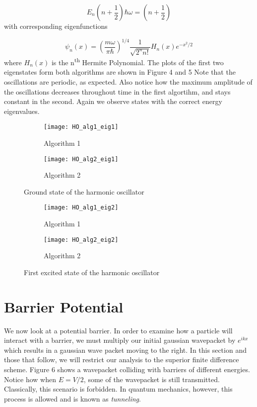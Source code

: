 \documentclass{article}
\begin{document}
\begin{equation}
E_n \left( n + \frac{1}{2} \right) \hbar \omega = \left( n + \frac{1}{2} \right)
\end{equation}
%
with corresponding eigenfunctions

\begin{equation}
\psi_n(x) = \left( \frac{m \omega}{\pi \hbar} \right)^{1/4} \frac{1}{\sqrt{2^n n!}} H_n(x)e^{-x^2/2}
\end{equation}
%
where $H_n(x)$ is the n\textsuperscript{th}  Hermite Polynomial. The plots of the first two eigenstates form both algorithms are shown in Figure 4 and 5
Note that the oscillations are periodic, as expected. Also notice how the maximum amplitude of the oscillations decreases throughout time in the first algortihm, and stays constant in the second. Again we observe states with the correct energy eigenvalues.

\begin{figure}
\centering
\begin{subfigure}[h!]{0.3\textwidth}
\centering
\texttt{[image: HO\_alg1\_eig1]}
\caption{Algorithm 1}
\end{subfigure}
%
\begin{subfigure}[h!]{0.3\textwidth}
\centering
\texttt{[image: HO\_alg2\_eig1]}
\caption{Algorithm 2}
\end{subfigure}

\caption{Ground state of the harmonic oscillator}
\end{figure}

\begin{figure}
\centering
\begin{subfigure}[h!]{0.3\textwidth}
\centering
\texttt{[image: HO\_alg1\_eig2]}
\caption{Algorithm 1}
\end{subfigure}
%
\begin{subfigure}[h!]{0.3\textwidth}
\centering
\texttt{[image: HO\_alg2\_eig2]}
\caption{Algorithm 2}
\end{subfigure}

\caption{First excited state of the harmonic oscillator}
\end{figure}

\section{Barrier Potential}

We now look at a potential barrier. In order to examine how a particle will interact with a barrier, we must multiply our initial gaussian wavepacket 
by $e^{ikx}$ which results in a gaussian wave packet moving to the right. In this section and those that follow, we will restrict our analysis to the superior finite difference scheme. Figure 6 shows a wavepacket colliding with barriers of different energies. Notice how when $ E = V/2 $, some of the wavepacket is still transmitted. Classically, this scenario is forbidden. In quantum mechanics, however, this process is allowed and is known as {\it tunneling}. 
\end{document}
